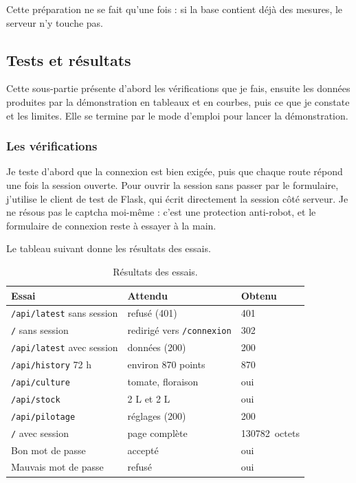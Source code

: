 Cette préparation ne se fait qu'une fois : si la base contient déjà des mesures, le serveur n'y touche pas.

\subsection{Tests et résultats}

Cette sous-partie présente d'abord les vérifications que je fais, ensuite les données produites par la démonstration en tableaux et en courbes, puis ce que je constate et les limites. Elle se termine par le mode d'emploi pour lancer la démonstration.

\subsubsection*{Les vérifications}

Je teste d'abord que la connexion est bien exigée, puis que chaque route répond une fois la session ouverte. Pour ouvrir la session sans passer par le formulaire, j'utilise le client de test de Flask, qui écrit directement la session côté serveur. Je ne résous pas le captcha moi-même : c'est une protection anti-robot, et le formulaire de connexion reste à essayer à la main.

Le tableau suivant donne les résultats des essais.

\begin{table}[H]
\centering
\small
\begin{tabularx}{\textwidth}{|l|Y|l|}
\hline
\textbf{Essai} & \textbf{Attendu} & \textbf{Obtenu} \\
\hline
\texttt{/api/latest} sans session & refusé (401) & 401 \\
\hline
\texttt{/} sans session & redirigé vers \texttt{/connexion} & 302 \\
\hline
\texttt{/api/latest} avec session & données (200) & 200 \\
\hline
\texttt{/api/history} 72 h & environ 870 points & 870 \\
\hline
\texttt{/api/culture} & tomate, floraison & oui \\
\hline
\texttt{/api/stock} & 2 L et 2 L & oui \\
\hline
\texttt{/api/pilotage} & réglages (200) & 200 \\
\hline
\texttt{/} avec session & page complète & \qty{130782}{octets} \\
\hline
Bon mot de passe & accepté & oui \\
\hline
Mauvais mot de passe & refusé & oui \\
\hline
\end{tabularx}
\caption{Résultats des essais.}
\end{table}


